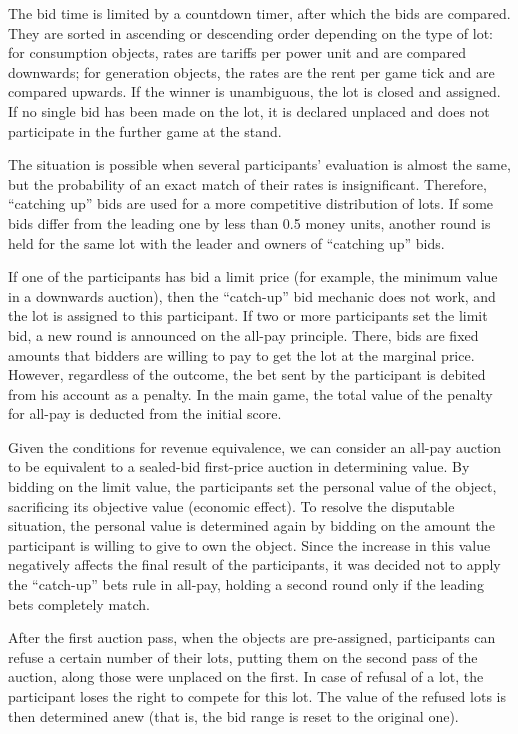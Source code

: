 \documentclass[
]{ceurart}
\begin{document}
The bid time is limited by a countdown timer, after which the bids are compared. They are sorted in ascending or descending order depending on the type of lot: for consumption objects, rates are tariffs per power unit and are compared downwards; for generation objects, the rates are the rent per game tick and are compared upwards. If the winner is unambiguous, the lot is closed and assigned. If no single bid has been made on the lot, it is declared unplaced and does not participate in the further game at the stand.

The situation is possible when several participants’ evaluation is almost the same, but the probability of an exact match of their rates is insignificant. Therefore, ``catching up'' bids are used for a more competitive distribution of lots. If some bids differ from the leading one by less than 0.5 money units, another round is held for the same lot with the leader and owners of ``catching up'' bids.

If one of the participants has bid a limit price (for example, the minimum value in a downwards auction), then the ``catch-up'' bid mechanic does not work, and the lot is assigned to this participant. If two or more participants set the limit bid, a new round is announced on the all-pay principle. There, bids are fixed amounts that bidders are willing to pay to get the lot at the marginal price. However, regardless of the outcome, the bet sent by the participant is debited from his account as a penalty. In the main game, the total value of the penalty for all-pay is deducted from the initial score.

Given the conditions for revenue equivalence, we can consider an all-pay auction to be equivalent to a sealed-bid first-price auction in determining value. By bidding on the limit value, the participants set the personal value of the object, sacrificing its objective value (economic effect). To resolve the disputable situation, the personal value is determined again by bidding on the amount the participant is willing to give to own the object. Since the increase in this value negatively affects the final result of the participants, it was decided not to apply the ``catch-up'' bets rule in all-pay, holding a second round only if the leading bets completely match.

After the first auction pass, when the objects are pre-assigned, participants can refuse a certain number of their lots, putting them on the second pass of the auction, along those were unplaced on the first. In case of refusal of a lot, the participant loses the right to compete for this lot. The value of the refused lots is then determined anew (that is, the bid range is reset to the original one).
\end{document}

